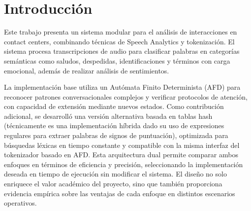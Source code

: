\section{Introducción}
Este trabajo presenta un sistema modular para el análisis de interacciones en contact centers,
combinando técnicas de Speech Analytics y tokenización. El sistema procesa transcripciones de
audio para clasificar palabras en categorías semánticas como saludos, despedidas,
identificaciones y términos con carga emocional, además de realizar análisis de sentimientos.

La implementación base utiliza un Autómata Finito Determinista (AFD) para reconocer patrones
conversacionales complejos y verificar protocolos de atención, con capacidad de extensión
mediante nuevos estados. Como contribución adicional, se desarrolló una versión alternativa
basada en tablas hash (técnicamente es una implementación híbrida dado su uso de expresiones
regulares para extraer palabras de signos de puntuación), optimizada para búsquedas léxicas en
tiempo constante y compatible con la misma interfaz del tokenizador basado en AFD. Esta
arquitectura dual permite comparar ambos enfoques en términos de eficiencia y precisión,
seleccionando la implementación deseada en tiempo de ejecución sin modificar el sistema. El
diseño no solo enriquece el valor académico del proyecto, sino que también proporciona
evidencia empírica sobre las ventajas de cada enfoque en distintos escenarios operativos.
